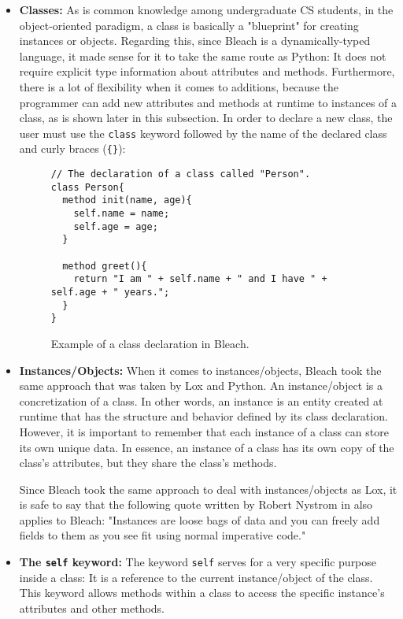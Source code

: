 \begin{itemize}
    \item \textbf{Classes:} As is common knowledge among undergraduate CS students, in the object-oriented paradigm, a class is basically a "blueprint" for creating instances or objects. Regarding this, since Bleach is a dynamically-typed language, it made sense for it to take the same route as Python: It does not require explicit type information about attributes and methods. Furthermore, there is a lot of flexibility when it comes to additions, because the programmer can add new attributes and methods at runtime to instances of a class, as is shown later in this subsection. In order to declare a new class, the user must use the \texttt{class} keyword followed by the name of the declared class and curly braces (\texttt{\{\}}):
\begin{figure}[H]
    \centering
    \begin{lstlisting}
// The declaration of a class called "Person".
class Person{
  method init(name, age){
    self.name = name;
    self.age = age;
  }

  method greet(){
    return "I am " + self.name + " and I have " + self.age + " years.";
  }
}
    \end{lstlisting}
    \caption{Example of a class declaration in Bleach.}
\end{figure}

    \item \textbf{Instances/Objects:} When it comes to instances/objects, Bleach took the same approach that was taken by Lox and Python. An instance/object is a concretization of a class. In other words, an instance is an entity created at runtime that has the structure and behavior defined by its class declaration. However, it is important to remember that each instance of a class can store its own unique data. In essence, an instance of a class has its own copy of the class’s attributes, but they share the class's methods.

    Since Bleach took the same approach to deal with instances/objects as Lox, it is safe to say that the following quote written by Robert Nystrom in \cite{nystrom2021crafting} also applies to Bleach: "Instances are loose bags of data and you can freely add fields to them as you see fit using normal imperative code."
    
    \item \textbf{The \texttt{self} keyword:} The keyword \texttt{self} serves for a very specific purpose inside a class: It is a reference to the current instance/object of the class. This keyword allows methods within a class to access the specific instance's attributes and other methods.
    

\end{itemize}
